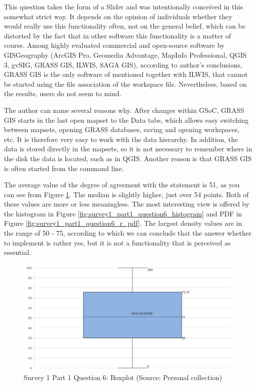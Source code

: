 \documentclass[a4paper,10pt,twoside]{article}
\begin{document}
\noindent This question takes the form of a Slider and was intentionally conceived in this somewhat strict way. It depends on the opinion of individuals whether they would really use this functionality often, not on the general belief, which can be distorted by the fact that in other software this functionality is a matter of course. Among highly evaluated commercial and open-source software by GISGeography \cite{gisgeography} (ArcGIS Pro, Geomedia Advantage, MapInfo Professional, QGIS 3, gvSIG, GRASS GIS, ILWIS, SAGA GIS), according to author's conclusions, GRASS GIS is the only software of mentioned together with ILWIS, that cannot be started using the file association of the workspace file. Nevertheless, based on the results, users do not seem to mind.

The author can name several reasons why. After changes within GSoC, GRASS GIS starts in the last open mapset to the Data tabs, which allows easy switching between mapsets, opening GRASS databases, saving and opening workspaces, etc. It is therefore very easy to work with the data hierarchy. In addition, the data is stored directly in the mapsets, so it is not necessary to remember where in the disk the data is located, such as in QGIS. Another reason is that GRASS GIS is often started from the command line.

The average value of the degree of agreement with the statement is 51, as you can see from Figure \ref{fig:survey1_part1_question6_boxplot}. The median is slightly higher, just over 54 points. Both of these values are more or less meaningless. The most interesting view is offered by the histogram in Figure \ref{fig:survey1_part1_question6_histogram} and PDF in Figure \ref{fig:survey1_part1_question6_r_pdf}. The largest density values are in the range of 50 - 75, according to which we can conclude that the answer whether to implement is rather yes, but it is not a functionality that is perceived as essential.

\vspace{0.3cm}
\begin{figure}[hbt!] 
\begin{center}
\includegraphics[width=12.5cm]{../surveys/analyzed_data/survey1_part1_question6_boxplot.png} 
\caption[Survey 1 Part 1 Question 6: Boxplot]{Survey 1 Part 1 Question 6: Boxplot (Source: Personal collection)}
\label{fig:survey1_part1_question6_boxplot}
\end{center}
\end{figure}
\end{document}
